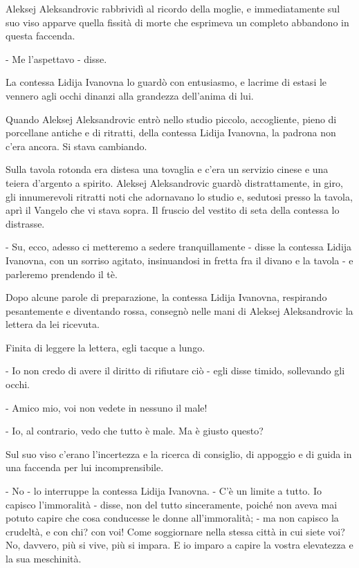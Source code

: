 Aleksej Aleksandrovic rabbrividì al ricordo della moglie, e immediatamente sul suo viso apparve quella fissità di morte che esprimeva un completo abbandono in questa faccenda. 

- Me l'aspettavo - disse. 

La contessa Lidija Ivanovna lo guardò con entusiasmo, e lacrime di estasi le vennero agli occhi dinanzi alla grandezza dell'anima di lui. 

\label{xxv-3} 

Quando Aleksej Aleksandrovic entrò nello studio piccolo, accogliente, pieno di porcellane antiche e di ritratti, della contessa Lidija Ivanovna, la padrona non c'era ancora. Si stava cambiando. 

Sulla tavola rotonda era distesa una tovaglia e c'era un servizio cinese e una teiera d'argento a spirito. Aleksej Aleksandrovic guardò distrattamente, in giro, gli innumerevoli ritratti noti che adornavano lo studio e, sedutosi presso la tavola, aprì il Vangelo che vi stava sopra. Il fruscio del vestito di seta della contessa lo distrasse. 

- Su, ecco, adesso ci metteremo a sedere tranquillamente - disse la contessa Lidija Ivanovna, con un sorriso agitato, insinuandosi in fretta fra il divano e la tavola - e parleremo prendendo il tè. 

Dopo alcune parole di preparazione, la contessa Lidija Ivanovna, respirando pesantemente e diventando rossa, consegnò nelle mani di Aleksej Aleksandrovic la lettera da lei ricevuta. 

Finita di leggere la lettera, egli tacque a lungo. 

- Io non credo di avere il diritto di rifiutare ciò - egli disse timido, sollevando gli occhi. 

- Amico mio, voi non vedete in nessuno il male! 

- Io, al contrario, vedo che tutto è male. Ma è giusto questo? 

Sul suo viso c'erano l'incertezza e la ricerca di consiglio, di appoggio e di guida in una faccenda per lui incomprensibile. 

- No - lo interruppe la contessa Lidija Ivanovna. - C'è un limite a tutto. Io capisco l'immoralità - disse, non del tutto sinceramente, poiché non aveva mai potuto capire che cosa conducesse le donne all'immoralità; - ma non capisco la crudeltà, e con chi? con voi! Come soggiornare nella stessa città in cui siete voi? No, davvero, più si vive, più si impara. E io imparo a capire la vostra elevatezza e la sua meschinità. 

